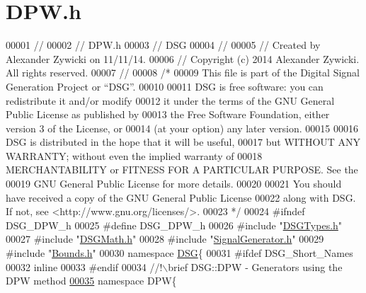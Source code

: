 \hypertarget{_d_p_w_8h_source}{\section{D\+P\+W.\+h}
\label{_d_p_w_8h_source}
}

\begin{DoxyCode}
00001 \textcolor{comment}{//}
00002 \textcolor{comment}{//  DPW.h}
00003 \textcolor{comment}{//  DSG}
00004 \textcolor{comment}{//}
00005 \textcolor{comment}{//  Created by Alexander Zywicki on 11/11/14.}
00006 \textcolor{comment}{//  Copyright (c) 2014 Alexander Zywicki. All rights reserved.}
00007 \textcolor{comment}{//}
00008 \textcolor{comment}{/*}
00009 \textcolor{comment}{ This file is part of the Digital Signal Generation Project or “DSG”.}
00010 \textcolor{comment}{}
00011 \textcolor{comment}{ DSG is free software: you can redistribute it and/or modify}
00012 \textcolor{comment}{ it under the terms of the GNU General Public License as published by}
00013 \textcolor{comment}{ the Free Software Foundation, either version 3 of the License, or}
00014 \textcolor{comment}{ (at your option) any later version.}
00015 \textcolor{comment}{}
00016 \textcolor{comment}{ DSG is distributed in the hope that it will be useful,}
00017 \textcolor{comment}{ but WITHOUT ANY WARRANTY; without even the implied warranty of}
00018 \textcolor{comment}{ MERCHANTABILITY or FITNESS FOR A PARTICULAR PURPOSE.  See the}
00019 \textcolor{comment}{ GNU General Public License for more details.}
00020 \textcolor{comment}{}
00021 \textcolor{comment}{ You should have received a copy of the GNU General Public License}
00022 \textcolor{comment}{ along with DSG.  If not, see <http://www.gnu.org/licenses/>.}
00023 \textcolor{comment}{ */}
00024 \textcolor{preprocessor}{#ifndef DSG\_DPW\_h}
00025 \textcolor{preprocessor}{#define DSG\_DPW\_h}
00026 \textcolor{preprocessor}{#include "\hyperlink{_d_s_g_types_8h}{DSGTypes.h}"}
00027 \textcolor{preprocessor}{#include "\hyperlink{_d_s_g_math_8h}{DSGMath.h}"}
00028 \textcolor{preprocessor}{#include "\hyperlink{_signal_generator_8h}{SignalGenerator.h}"}
00029 \textcolor{preprocessor}{#include "\hyperlink{_bounds_8h}{Bounds.h}"}
00030 \textcolor{keyword}{namespace }\hyperlink{namespace_d_s_g}{DSG}\{
00031 \textcolor{preprocessor}{#ifdef DSG\_Short\_Names}
00032     \textcolor{keyword}{inline}
00033 \textcolor{preprocessor}{#endif}
00034 \textcolor{comment}{    //!\(\backslash\)brief DSG::DPW - Generators using the DPW method}
\hypertarget{_d_p_w_8h_source_l00035}{}\hyperlink{namespace_d_s_g_1_1_d_p_w}{00035} \textcolor{comment}{}    \textcolor{keyword}{namespace }DPW\{\textcolor{comment}{}

\end{DoxyCode}
